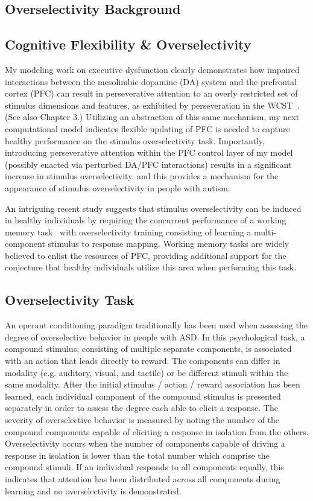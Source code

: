 \documentclass[man]{apa}
\begin{document}
\subsection{Overselectivity Background}

\subsection{Cognitive Flexibility \& Overselectivity}
My modeling work on executive dysfunction clearly demonstrates how impaired interactions between the mesolimbic dopamine (DA) system and the prefrontal cortex (PFC) can result in perseverative attention to an overly restricted set of stimulus dimensions and features, as exhibited by perseveration in the WCST~\cite{KrieteNoelleICDL06}.  (See also Chapter 3.)  Utilizing an abstraction of this same mechanism, my next computational model indicates flexible updating of PFC is needed to capture healthy performance on the stimulus overselectivity task.  Importantly, introducing perseverative attention within the PFC control layer of my model (possibly enacted via perturbed DA/PFC interactions) results in a significant increase in stimulus overselectivity, and this provides a mechanism for the appearance of stimulus overselectivity in people with autism.   

An intriguing recent study suggests that stimulus overselectivity can be induced in healthy individuals by requiring the concurrent performance of a working memory task~\cite{RefWorks:112} with overselectivity training consisting of learning a multi-component stimulus to response mapping.  Working memory tasks are widely believed to enlist the resources of PFC, providing additional support for the conjecture that healthy individuals utilize this area when performing this task.


\subsection{Overselectivity Task}
An operant conditioning paradigm traditionally has been used when assessing the degree of overselective behavior in people with ASD.  In this psychological task, a compound stimulus, consisting of multiple separate components, is associated with an action that leads directly to reward.  The components can differ in modality (e.g. auditory, visual, and tactile) or be different stimuli within the same modality.  After the initial stimulus / action / reward association has been learned, each individual component of the compound stimulus is presented separately in order to assess the degree each able to elicit a response.  The severity of overselective behavior is measured by noting the number of the compound components capable of eliciting a response in isolation from the others.  Overselectivity occurs when the number of components capable of driving a response in isolation is lower than the total number which comprise the compound stimuli.  If an individual responds to all components equally, this indicates that attention has been distributed across all components during learning and no overselectivity is demonstrated.   
\end{document}
